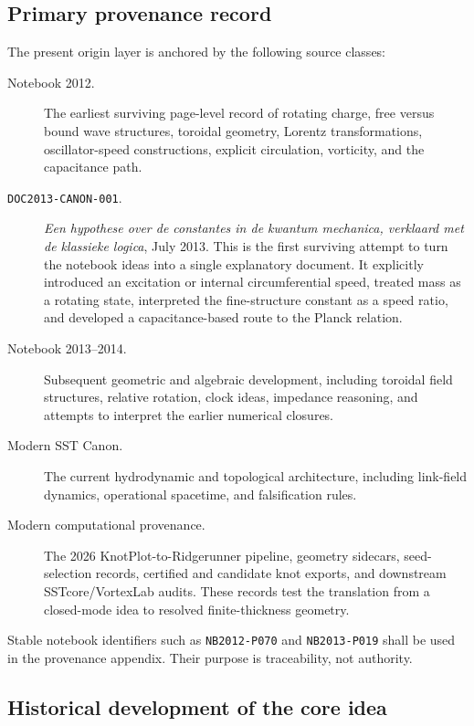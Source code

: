 \documentclass[11pt]{article}
\theoremstyle{definition}
\theoremstyle{plain}
\theoremstyle{remark}
\begin{document}
\subsection{Primary provenance record}
\label{subsec:primary_provenance_record}

The present origin layer is anchored by the following source classes:
\begin{description}
    \item[Notebook 2012.] The earliest surviving page-level record of rotating
    charge, free versus bound wave structures, toroidal geometry, Lorentz
    transformations, oscillator-speed constructions, explicit circulation,
    vorticity, and the capacitance path.

    \item[\texttt{DOC2013-CANON-001}.] \emph{Een hypothese over de constantes in
    de kwantum mechanica, verklaard met de klassieke logica}, July 2013. This is
    the first surviving attempt to turn the notebook ideas into a single
    explanatory document. It explicitly introduced an excitation or internal
    circumferential speed, treated mass as a rotating state, interpreted the
    fine-structure constant as a speed ratio, and developed a capacitance-based
    route to the Planck relation.

    \item[Notebook 2013--2014.] Subsequent geometric and algebraic development,
    including toroidal field structures, relative rotation, clock ideas,
    impedance reasoning, and attempts to interpret the earlier numerical
    closures.

    \item[Modern SST Canon.] The current hydrodynamic and topological
    architecture, including link-field dynamics, operational spacetime, and
    falsification rules.

    \item[Modern computational provenance.] The 2026 KnotPlot-to-Ridgerunner
    pipeline, geometry sidecars, seed-selection records, certified and candidate
    knot exports, and downstream SSTcore/VortexLab audits. These records test the
    translation from a closed-mode idea to resolved finite-thickness geometry.
\end{description}

Stable notebook identifiers such as \texttt{NB2012-P070} and
\texttt{NB2013-P019} shall be used in the provenance appendix. Their purpose is
traceability, not authority.

\subsection{Historical development of the core idea}
\label{subsec:historical_development_core}
\end{document}
